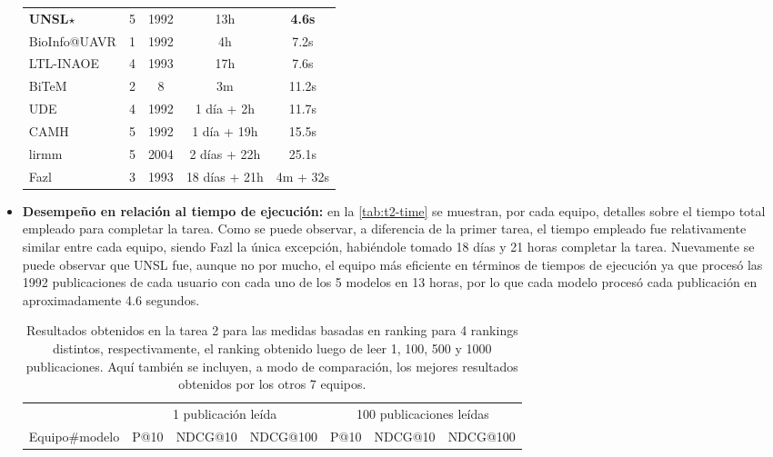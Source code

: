 \begin{itemize}
\begin{table}[t!]
\begin{tabular}{l c c|c | c}
\textbf{UNSL}$\star$ & 5 & 1992 & 13h & \textbf{4.6s} \\
BioInfo@UAVR & 1 & 1992 & 4h & 7.2s \\
LTL-INAOE & 4 & 1993 & 17h & 7.6s \\
BiTeM & 2 & 8 & 3m & 11.2s \\
UDE & 4 & 1992 & 1 día + 2h & 11.7s \\
CAMH & 5 & 1992 & 1 día + 19h & 15.5s \\
lirmm & 5 & 2004 & 2 días + 22h & 25.1s \\
Fazl & 3 & 1993 & 18 días + 21h & 4m + 32s \\

\hline
\end{tabular}
\end{table}

    \item \textbf{Desempeño en relación al tiempo de ejecución:} en la \autoref{tab:t2-time} se muestran, por cada equipo, detalles sobre el tiempo total empleado para completar la tarea.
    Como se puede observar, a diferencia de la primer tarea, el tiempo empleado fue relativamente similar entre cada equipo, siendo Fazl la única excepción, habiéndole tomado 18 días y 21 horas completar la tarea.
    Nuevamente se puede observar que UNSL fue, aunque no por mucho, el equipo más eficiente en términos de tiempos de ejecución ya que procesó las 1992 publicaciones de cada usuario con cada uno de los 5 modelos en 13 horas, por lo que cada modelo procesó cada publicación en aproximadamente 4.6 segundos.

\begin{table}[t!]
\centering
\caption{Resultados obtenidos en la tarea 2 para las medidas basadas en ranking para 4 rankings distintos, respectivamente, el ranking obtenido luego de leer 1, 100, 500 y 1000 publicaciones. Aquí también se incluyen, a modo de comparación, los mejores resultados obtenidos por los otros 7 equipos.}
\label{tab:t2-result-ranking}
\begin{tabular}{l c c c|c c c}
\hline
& \multicolumn{3}{c}{1 publicación leída} & \multicolumn{3}{c}{100 publicaciones leídas} \\
Equipo\#modelo & P@10 & NDCG@10 & NDCG@100 &  P@10 & NDCG@10 & NDCG@100 \\ \hline


\end{tabular}
\end{table}
\end{itemize}
